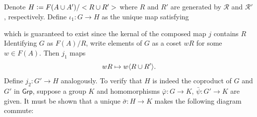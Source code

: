 \documentclass[12pt]{article}
\begin{document}
\subsection{} 
Denote $H \vcentcolon= F(A \cup A') / <R \cup R'>$ where $R$ and $R'$ are generated by $\mathscr{R}$ and $\mathscr{R'}$, respectively. 
Define $\iota_1: G \rightarrow H$ as the unique map satisfying 
\begin{center}
\end{center}
which is guaranteed to exist since the kernal of the composed map $j$ contains $R$ 
Identifying $G$ as $F(A) / R$, write elements of $G$ as a coset $wR$ for some $w \in F(A)$.  
Then $j_1$ maps 
$$wR \mapsto w\langle R \cup R'\rangle.$$
Define $j_2: G' \rightarrow H$ analogously. 
To verify that $H$ is indeed the coproduct of $G$ and $G'$ in $\mathsf{Grp}$, suppose a group $K$ and homomorphisms $\bar{\varphi}: G \rightarrow K$, $\bar{\psi}: G' \rightarrow K$ are given. 
It must be shown that a unique $\bar{\sigma}: H \rightarrow K$ makes the following diagram commute: 
\end{document}
